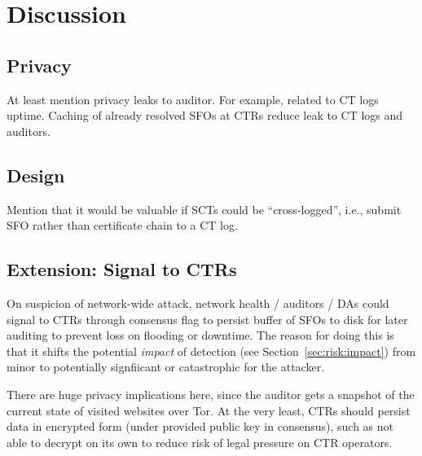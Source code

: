 \section{Discussion} \label{sec:discussion}

\subsection{Privacy}
At least mention privacy leaks to auditor. For example, related to CT logs
uptime. Caching of already resolved SFOs at CTRs reduce leak to CT logs and
auditors.

\subsection{Design}
Mention that it would be valuable if SCTs could be ``cross-logged'', i.e.,
submit SFO rather than certificate chain to a CT log.

\subsection{Extension: Signal to CTRs}
On suspicion of network-wide attack, network health / auditors / DAs could
signal to CTRs through consensus flag to persist buffer of SFOs to disk for
later auditing to prevent loss on flooding or downtime. The reason for doing
this is that it shifts the potential \emph{impact} of detection (see
Section~\ref{sec:risk:impact}) from minor to potentially signfiicant or
catastrophic for the attacker.

There are huge privacy implications here, since the auditor gets a snapshot of
the current state of visited websites over Tor. At the very least, CTRs should
persist data in encrypted form (under provided public key in consensus), such as
not able to decrypt on its own to reduce risk of legal pressure on CTR
operators.


